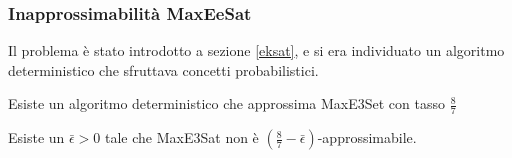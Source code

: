 \subsubsection{Inapprossimabilità MaxEeSat}
Il problema è stato introdotto a sezione \ref{eksat}, e si era individuato un algoritmo 
deterministico che sfruttava concetti probabilistici.

\begin{theorem}
    Esiste un algoritmo deterministico che approssima MaxE3Set con tasso
    $\frac{8}{7}$
\end{theorem}

\begin{theorem}
    \label{th1ek}
    Esiste un $\bar{\epsilon} > 0$ tale che MaxE3Sat non è $(\frac{8}{7}-\bar{\epsilon})$-approssimabile. 
\end{theorem}


